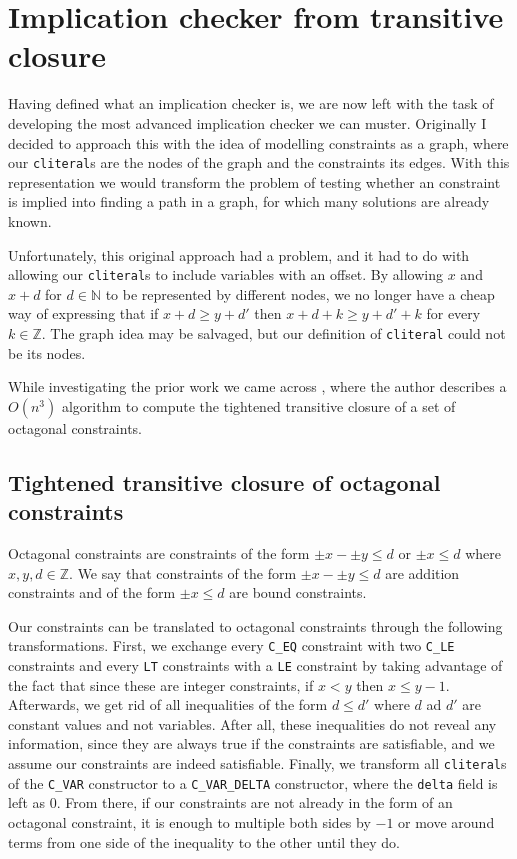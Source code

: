 \chapter{Implication checker from transitive closure}
\label{cap:imp-checker}

Having defined what an implication checker is, we are now left with the task of
developing the most advanced implication checker we can muster. Originally I
decided to approach this with the idea of modelling constraints as a graph, where
our \texttt{cliteral}s are the nodes of the graph and the constraints its edges. With 
this representation we would transform the problem of testing whether an constraint is
implied into finding a path in a graph, for which many solutions are already 
known.

Unfortunately, this original approach had a problem, and it had to do with 
allowing our \texttt{cliteral}s to include variables with an offset.
By allowing $x$ and $x + d$ for $d \in \mathbb{N}$ to be represented by 
different nodes, we no longer have a cheap way of expressing that if $x + d \ge y + d'$ then $x + d + k \ge y + d' + k$ for every $k\in \mathbb{Z}$. The graph
idea may be salvaged, but our definition of \texttt{cliteral} could not be
its nodes.

While investigating the prior work we came across \cite{TransitiveClosure}, where
the author describes a $O(n^3)$ algorithm to compute the tightened transitive 
closure of a set of octagonal constraints.

\section{Tightened transitive closure of octagonal constraints}
\label{sect:tightened-transitive-closure}

Octagonal constraints are constraints of the form $\pm x - \pm y \le d$ or 
$\pm x \le d$ where $x,y,d \in \mathbb{Z}$. We say that constraints of the form
$\pm x - \pm y \le d$ are addition constraints and of the form $\pm x \le d$ are
bound constraints.

Our constraints can be translated to octagonal constraints through the following 
transformations. First, we exchange every \texttt{C_EQ} constraint with two
\texttt{C_LE} constraints and every \texttt{LT} constraints with a 
\texttt{LE} constraint by taking advantage of the fact that since these are 
integer constraints, if $x < y$ then $x \le y-1$. Afterwards, we get rid of all 
inequalities of the form $d \le d'$ where $d$ ad $d'$ are constant values and not
variables. After all, these inequalities do not reveal any information, since they
are always true if the constraints are satisfiable, and we assume our constraints
are indeed satisfiable. Finally, we transform all \texttt{cliteral}s of the
\texttt{C_VAR} constructor to a \texttt{C_VAR_DELTA} constructor, where
the \texttt{delta} field is left as 0. From there, if our constraints are not
already in the form of an octagonal constraint, it is enough to multiple both sides
by $-1$ or move around terms from one side of the inequality to the other until 
they do.

